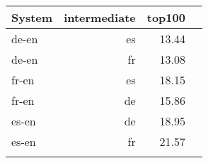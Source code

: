 \begin{tabular}{lrrr} \toprule

System & intermediate & top100\\
\toprule
de-en & es & 13.44 \\
de-en & fr & 13.08 \\
fr-en & es & 18.15 \\
fr-en & de & 15.86 \\
es-en & de & 18.95 \\
es-en & fr & 21.57 \\


\bottomrule
\centering
\small
\end{tabular}



